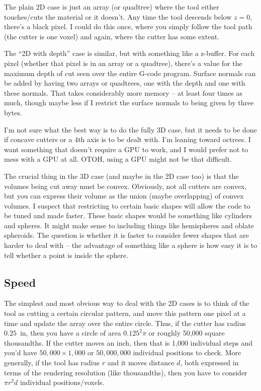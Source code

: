 \documentclass{article}
\begin{document}
The plain 2D case is just an array (or quadtree) where the tool either
touches/cuts the material or it doesn't. Any time the tool descends
below $z=0$, there's a black pixel. I could do this once, where you
simply follow the tool path (the cutter is one voxel) and again, where
the cutter has some extent. 

The ``2D with depth'' case is similar, but with something like a
z-buffer. For each pixel (whether that pixel is in an array or a
quadtree), there's a value for the maximum depth of cut seen over the
entire G-code program. Surface normals can be added by having two
arrays or quadtrees, one with the depth and one with these
normals. That takes considerably more memory -- at least four times as
much, though maybe less if I restrict the surface normals to being
given by three bytes.

I'm not sure what the best way is to do the fully 3D case, but it
needs to be done if concave cutters or a 4th axis is to be dealt
with. I'm leaning toward octrees. I want something that doesn't
require a GPU to work, and I would prefer not to mess with a GPU at
all. OTOH, using a GPU might not be that difficult.

The crucial thing in the 3D case (and maybe in the 2D case too) is
that the volumes being cut away must be convex. Obviously, not all
cutters are convex, but you can express their volume as the union
(maybe overlapping) of convex volumes. I suspect that restricting to
certain basic shapes will allow the code to be tuned and made
faster. These basic shapes would be something like cylinders and
spheres. It might make sense to including things like hemispheres and
oblate spheroids. The question is whether it is faster to consider
fewer shapes that are harder to deal with -- the advantage of
something like a sphere is how easy it is to tell whether a point is
inside the sphere.

\subsection*{Speed}

The simplest and most obvious way to deal with the 2D cases is to
think of the tool as cutting a certain circular pattern, and move this
pattern one pixel at a time and update the array over the entire
circle. Thus, if the cutter has radius $0.25$~in, then you have a
circle of area $0.125^2\pi$ or roughly 50,000 square thousandths. If
the cutter moves an inch, then that is 1,000 individual steps and
you'd have $50,000\times 1,000$ or $50,000,000$ individual positions to
check. More generally, if the tool has radius $r$ and it moves
distance $d$, both expressed in terms of the rendering resolution
(like thousandths), then you have to consider $\pi r^2d$ individual
positions/voxels.
\end{document}
